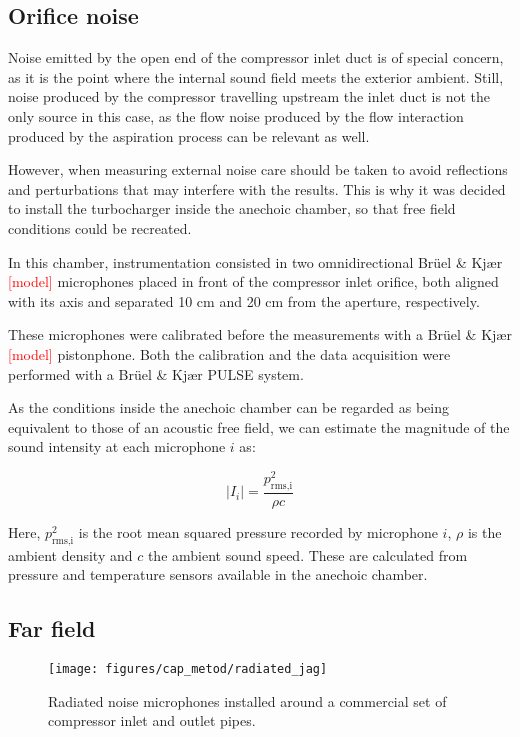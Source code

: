 \subsection{Orifice noise}
\label{sub:metod_orifice_noise}

Noise emitted by the open end of the compressor inlet duct is of special concern, as it is the point where the internal sound field meets the exterior ambient. Still, noise produced by the compressor travelling upstream the inlet duct is not the only source in this case, as the flow noise produced by the flow interaction produced by the aspiration process can be relevant as well.

However, when measuring external noise care should be taken to avoid reflections and perturbations that may interfere with the results. This is why it was decided to install the turbocharger inside the anechoic chamber, so that free field conditions could be recreated.

In this chamber, instrumentation consisted in two omnidirectional Brüel \& Kjær \textcolor{red}{[model]} microphones placed in front of the compressor inlet orifice, both aligned with its axis and separated 10 cm and 20 cm from the aperture, respectively.

These microphones were calibrated before the measurements with a Brüel \& Kjær \textcolor{red}{[model]} pistonphone. Both the calibration and the data acquisition were performed with a Brüel \& Kjær PULSE system.

As the conditions inside the anechoic chamber can be regarded as being equivalent to those of an acoustic free field, we can estimate the magnitude of the sound intensity at each microphone $i$ as:

\begin{equation}
	|I_i| = \frac{p^2_\text{rms,i}}{\rho c}
\end{equation}

Here, $p^2_\text{rms,i}$ is the root mean squared pressure recorded by microphone $i$, $\rho$ is the ambient density and $c$ the ambient sound speed. These are calculated from pressure and temperature sensors available in the anechoic chamber.

\subsection{Far field}
\label{sub:metod_far_field}

\begin{figure*}[b!]
\centering
\texttt{[image: figures/cap\_metod/radiated\_jag]}
\caption{Radiated noise microphones installed around a commercial set of compressor inlet and outlet pipes.}
\label{fig:radiated_jag}
\end{figure*}

